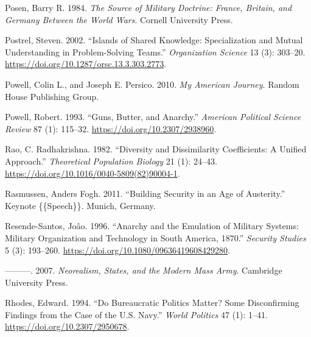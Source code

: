 \documentclass[
  12,
  letterpaper,
  DIV=11,
  numbers=noendperiod]{scrartcl}
\newlength{\cslhangindent}
\newlength{\cslentryspacingunit} %
\newenvironment{CSLReferences}[2] %
 {%
  \setlength{\parindent}{0pt}
  \ifodd #1
  \let\oldpar\par
  \def\par{\hangindent=\cslhangindent\oldpar}
  \fi
  \setlength{\parskip}{#2\cslentryspacingunit}
 }%
 {}
\begin{document}
\begin{CSLReferences}{1}{0}
\leavevmode{}%
Posen, Barry R. 1984. \emph{The {Source} of {Military Doctrine}:
{France}, {Britain}, and {Germany Between} the {World Wars}}. {Cornell
University Press}.

\leavevmode{}%
Postrel, Steven. 2002. {``Islands of {Shared Knowledge}:
{Specialization} and {Mutual Understanding} in {Problem-Solving
Teams}.''} \emph{Organization Science} 13 (3): 303--20.
\url{https://doi.org/10.1287/orsc.13.3.303.2773}.

\leavevmode{}%
Powell, Colin L., and Joseph E. Persico. 2010. \emph{My {American
Journey}}. {Random House Publishing Group}.

\leavevmode{}%
Powell, Robert. 1993. {``Guns, {Butter}, and {Anarchy}.''}
\emph{American Political Science Review} 87 (1): 115--32.
\url{https://doi.org/10.2307/2938960}.

\leavevmode{}%
Rao, C. Radhakrishna. 1982. {``Diversity and Dissimilarity Coefficients:
{A} Unified Approach.''} \emph{Theoretical Population Biology} 21 (1):
24--43. \url{https://doi.org/10.1016/0040-5809(82)90004-1}.

\leavevmode{}%
Rasmussen, Anders Fogh. 2011. {``Building Security in an Age of
Austerity.''} Keynote \{\{Speech\}\}. {Munich, Germany}.

\leavevmode{}%
Resende-Santos, Joâo. 1996. {``Anarchy and the Emulation of Military
Systems: {Military} Organization and Technology in {South America},
1870.''} \emph{Security Studies} 5 (3): 193--260.
\url{https://doi.org/10.1080/09636419608429280}.

\leavevmode{}%
---------. 2007. \emph{Neorealism, {States}, and the {Modern Mass
Army}}. {Cambridge University Press}.

\leavevmode{}%
Rhodes, Edward. 1994. {``Do {Bureaucratic Politics Matter}? {Some
Disconfirming Findings} from the {Case} of the {U}.{S}. {Navy}.''}
\emph{World Politics} 47 (1): 1--41.
\url{https://doi.org/10.2307/2950678}.


\end{CSLReferences}
\end{document}

